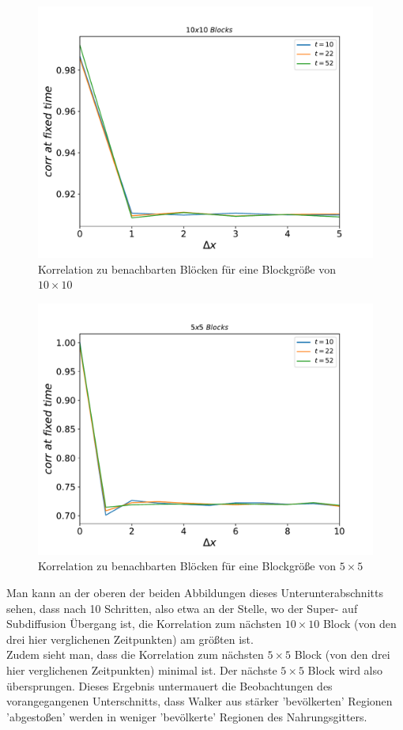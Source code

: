 \documentclass[a4paper, 12pt]{report}
\begin{document}
\begin{figure}[h!]
	\centering
	\includegraphics[scale=0.8]{dens10_corr10.pdf}
	\caption{Korrelation zu benachbarten Blöcken für eine Blockgröße von $10\times 10$}
\end{figure}

\begin{figure}[h!]
	\centering
	\includegraphics[scale=0.8]{dens10_corr5.pdf}
	\caption{Korrelation zu benachbarten Blöcken für eine Blockgröße von $5\times 5$}
\end{figure}

\clearpage

\noindent Man kann an der oberen der beiden Abbildungen dieses Unterunterabschnitts sehen, dass nach 10 Schritten, also etwa an der Stelle, wo der Super- auf Subdiffusion Übergang ist, die Korrelation zum nächsten $10\times 10$ Block (von den drei hier verglichenen Zeitpunkten) am größten ist.
\\
\noindent Zudem sieht man, dass die Korrelation zum nächsten $5\times5$ Block (von den drei hier verglichenen Zeitpunkten) minimal ist. Der nächste $5\times 5$ Block wird also übersprungen. Dieses Ergebnis untermauert die Beobachtungen des vorangegangenen Unterschnitts, dass Walker aus stärker 'bevölkerten' Regionen 'abgestoßen' werden in weniger 'bevölkerte' Regionen des Nahrungsgitters.
\end{document}
